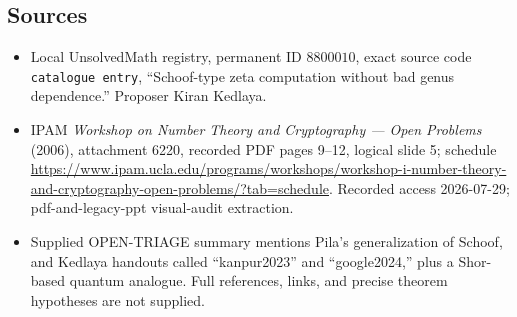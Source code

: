 \documentclass[11pt]{article}
\begin{document}
\subsection{Sources}
\begin{itemize}
\item Local UnsolvedMath registry, permanent ID \(8800010\), exact source code \texttt{catalogue entry}, ``Schoof-type zeta computation without bad genus dependence.'' Proposer Kiran Kedlaya.
\item IPAM \emph{Workshop on Number Theory and Cryptography --- Open Problems} (2006), attachment 6220, recorded PDF pages 9--12, logical slide 5; schedule \url{https://www.ipam.ucla.edu/programs/workshops/workshop-i-number-theory-and-cryptography-open-problems/?tab=schedule}. Recorded access 2026-07-29; pdf-and-legacy-ppt visual-audit extraction.
\item Supplied OPEN-TRIAGE summary mentions Pila's generalization of Schoof, and Kedlaya handouts called ``kanpur2023'' and ``google2024,'' plus a Shor-based quantum analogue. Full references, links, and precise theorem hypotheses are not supplied.
\end{itemize}
\end{document}
